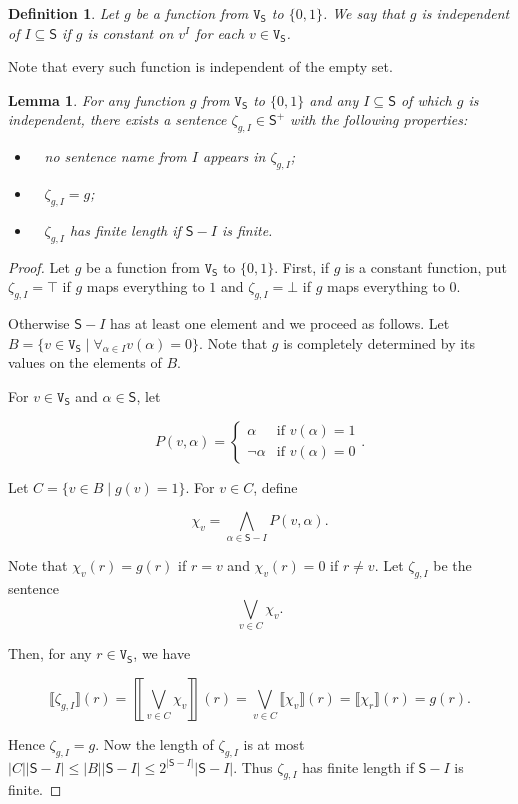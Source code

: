 \documentclass[12pt]{kluwer}
\newtheorem{lem}[thm]{Lemma}
\newtheorem{defn}{Definition}
\theoremstyle{remark}
\def\S{\textsf{S}}
\def\V{\texttt{V}}
\begin{document}
\begin{defn}
Let $g$ be a function from $\V_\S$ to $\{0, 1\}$.  We say that $g$ is \emph{independent of} $I \subseteq \S$ if $g$ is constant on $v^I$ for each $v \in \V_\S$.
\end{defn}

Note that every such function is independent of the empty set.

\begin{lem}\label{LanguageIsComplete}
For any function $g$ from $\V_\S$ to $\{0, 1\}$ and any $I \subseteq \S$ of which $g$ is independent, there exists a sentence $\zeta_{g, I} \in \S^+$ with the following properties:
\begin{itemize}
\item $\;\;$ no sentence name from $I$ appears in $\zeta_{g, I}$;  
\item $\;\;$ $\zeta_{g, I} = g$;
\item $\;\;$ $\zeta_{g, I}$ has finite length if $\S - I$ is finite.
\end{itemize}
\end{lem}

\begin{proof}
Let $g$ be a function from $\V_\S$ to  $\{0, 1\}$.  First, if $g$ is a constant function, put $\zeta_{g, I} = \top$ if $g$ maps everything to $1$ and $\zeta_{g, I} = \bot$ if $g$ maps everything to $0$.\newline

Otherwise $\S - I$ has at least one element and we proceed as follows.  Let $B = \{v \in \V_\S \mid \forall_{\alpha \in I} v(\alpha) = 0\}$. Note that $g$ is completely determined by its values on the elements of $B$. \newline

For $v \in \V_\S$ and $\alpha \in \S$, let 

\[P(v, \alpha) = \begin{cases}
\alpha & \text{if } v(\alpha) = 1 \\
\neg \alpha & \text{if } v(\alpha) = 0
\end{cases}.\]

Let $C = \{v \in B \mid g(v) = 1 \}$. For $v \in C$, define

\[\chi_v = \bigwedge_{\alpha \in \S - I} P(v, \alpha).\] 

Note that $\chi_v(r) = g(r)$ if $r = v$ and $\chi_v(r) = 0$ if $r \neq v$. Let $\zeta_{g, I}$ be the sentence
\[\bigvee_{v \in C} \chi_v.\]

Then, for any $r \in \V_\S$, we have 

\[\llbracket \zeta_{g, I} \rrbracket(r) = \left\llbracket\bigvee_{v \in C} \chi_v \right\rrbracket(r) = \bigvee_{v \in C} \llbracket \chi_v \rrbracket(r) = \llbracket \chi_r \rrbracket(r) = g(r).\]

Hence $\zeta_{g, I} = g$.  Now the length of  $\zeta_{g, I}$ is at most $|C||\S - I| \leq |B||\S - I| \leq 2^{|\S - I|}|\S - I|$. Thus $\zeta_{g, I}$ has finite length if  $\S - I$ is finite. 
\end{proof}
\end{document}
